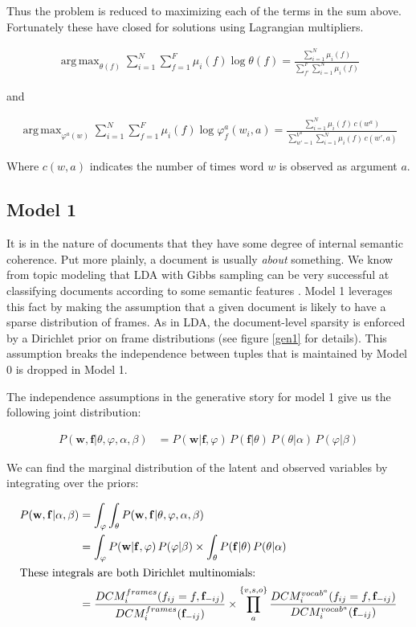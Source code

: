 \documentclass{article} %
\renewcommand\phi\varphi
\DeclareMathOperator*{\argmax}{arg\,max}
\begin{document}
Thus the problem is reduced to maximizing each of the terms in the sum above. Fortunately
these have closed for solutions using Lagrangian multipliers.


\begin{align}
\argmax_{\theta(f)}\sum_{i=1}^N\sum_{f=1}^F\mu_i(f)\log\theta(f)
= \frac{\sum_{i=1}^N\mu_i(f)}{\sum_{f'}^F\sum_{i=1}^N\mu_i(f)}
\end{align}

and

\begin{align}
\argmax_{\phi^a(w)}\sum_{i=1}^N\sum_{f=1}^F\mu_i(f)\log \phi_f^a(w_i,a)
= \frac{\sum_{i=1}^N \mu_i(f)\,c(w^a)}{\sum_{w'=1}^{V^a}\sum_{i=1}^N \mu_i(f)\,c(w',a)}
\end{align}

Where $c(w,a)$ indicates the number of times word $w$ is observed as argument $a$.

\subsection{Model 1}

It is in the nature of documents that they have some degree of internal semantic
coherence. Put more plainly, a document is usually \emph{about} something. We
know from topic modeling that LDA with Gibbs sampling can be very successful at
classifying documents according to some semantic features \citep{blei2003}.
Model 1 leverages this fact by making the assumption that a given document is 
likely to have a sparse distribution of frames. As in LDA, the document-level
sparsity is enforced by a Dirichlet prior on frame distributions (see figure
\ref{gen1} for details). This assumption breaks the independence between tuples 
that is maintained by Model 0 is dropped in Model 1.

The independence assumptions in the generative story for model 1 give us the 
following joint distribution:

\begin{align*}
P(\mathbf{w},\mathbf{f}|\theta,\phi,\alpha,\beta)
&=P(\mathbf{w}|\mathbf{f},\phi)\,P(\mathbf{f}|\theta)\,P(\theta|\alpha)\,P(\phi|\beta)
\end{align*}

We can find the marginal distribution of the latent and observed variables by
integrating over the priors:

\begin{align*}
 P(\mathbf{w},\mathbf{f}|\alpha,\beta)
&=\int_\phi\int_\theta P(\mathbf{w},\mathbf{f}|\theta,\phi,\alpha,\beta)\\
&=     \int_\phi P(\mathbf{w}|\mathbf{f},\phi )\,P(\phi|\beta)
\times \int_\theta P(\mathbf{f}|\theta)\,P(\theta|\alpha)\\
\intertext{These integrals are both Dirichlet multinomials:}
&=\frac{DCM_i^{frames}(f_{ij}=f, \mathbf{f}_{-ij})}{DCM_i^{frames}(\mathbf{f}_{-ij})}\times
\prod_a^{\{v,s,o\}}\frac{DCM_i^{vocab^a}(f_{ij}=f, \mathbf{f}_{-ij})}{DCM_i^{vocab^a}(\mathbf{f}_{-ij})}
\end{align*}
\end{document}
